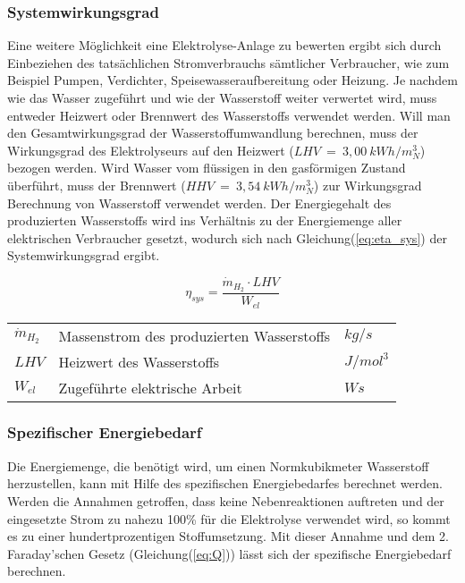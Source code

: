 \documentclass[onecolumn,10pt,titlepage]{article}
\begin{document}
		\subsubsection*{Systemwirkungsgrad}
		Eine weitere Möglichkeit eine Elektrolyse-Anlage zu bewerten ergibt sich durch Einbeziehen des tatsächlichen Stromverbrauchs sämtlicher Verbraucher, wie zum Beispiel Pumpen, Verdichter, Speisewasseraufbereitung oder Heizung. Je nachdem wie das Wasser zugeführt und wie der Wasserstoff weiter verwertet wird, muss entweder Heizwert oder Brennwert des Wasserstoffs verwendet werden.\cite{Smolinka.05.07.2011} Will man den Gesamtwirkungsgrad der Wasserstoffumwandlung berechnen, muss der Wirkungsgrad des Elektrolyseurs auf den Heizwert ($LHV~=~3,00 ~kWh/m^3_N$) bezogen werden. Wird Wasser vom flüssigen in den gasförmigen Zustand überführt, muss der Brennwert ($HHV~=~3,54~ kWh/m^3_N$) zur Wirkungsgrad Berechnung von Wasserstoff verwendet werden. Der Energiegehalt des produzierten Wasserstoffs wird ins Verhältnis zu der Energiemenge aller elektrischen Verbraucher gesetzt, wodurch sich nach Gleichung(\ref{eq:eta_sys}) der Systemwirkungsgrad ergibt.\cite{Bayer.2000} 
		
		\begin{equation}
		\label{eq:eta_sys}
		\eta_{sys}=\frac{\dot{m}_{H_2}\cdot LHV}{W_{el}}
		\end{equation}
		
		\begin{table}[H]
			\begin{tabular*}{\textwidth}{lll}
				$\dot{m}_{H_2}$&Massenstrom des produzierten Wasserstoffs&$kg/s$\\
				$LHV$&Heizwert des Wasserstoffs&$J/mol^3$\\
				$W_{el}$&Zugeführte elektrische Arbeit&$Ws$\\
			\end{tabular*}
		\end{table}
		\subsubsection*{Spezifischer Energiebedarf}
		Die Energiemenge, die benötigt wird, um einen Normkubikmeter Wasserstoff herzustellen, kann mit Hilfe des spezifischen Energiebedarfes berechnet werden.\cite{Hey.26.Oktober2012} Werden die Annahmen getroffen, dass keine Nebenreaktionen auftreten und der eingesetzte Strom zu nahezu 100\% für die Elektrolyse verwendet wird, so kommt es zu einer hundertprozentigen Stoffumsetzung. Mit dieser Annahme und dem 2. Faraday’schen Gesetz (Gleichung(\ref{eq:Q})) lässt sich der spezifische Energiebedarf berechnen.
		
\end{document}
